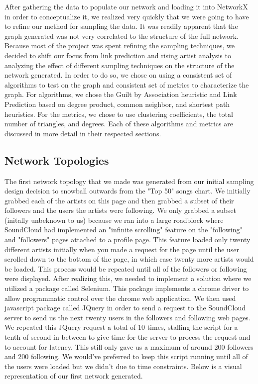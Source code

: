 \documentclass{article}
\begin{document}
After gathering the data to populate our network and loading it into NetworkX in order to conceptualize it, we realized very quickly that we were going to have to refine our method for sampling the data.  It was readily apparent that the graph generated was not very correlated to the structure of the full network.  Because most of the project was spent refining the sampling techniques, we decided to shift our focus from link prediction and rising artist analysis to analyzing the effect of different sampling techniques on the structure of the network generated.  In order to do so, we chose on using a consistent set of algorithms to test on the graph and consistent set of metrics to characterize the graph.  For algorithms, we chose the Guilt by Association heuristic and Link Prediction based on degree product, common neighbor, and shortest path heuristics.  For the metrics, we chose to use clustering coefficients, the total number of triangles, and degrees.  Each of these algorithms and metrics are discussed in more detail in their respected sections.

\subsection{Network Topologies}
The first network topology that we made was generated from our initial sampling design decision to snowball outwards from the "Top 50" songs chart.  We initially grabbed each of the artists on this page and then grabbed a subset of their followers and the users the artists were following.  We only grabbed a subset (initally unbeknown to us) because we ran into a large roadblock where SoundCloud had implemented an "infinite scrolling" feature on the "following" and "followers" pages attached to a profile page.  This feature loaded only twenty different artists initially when you made a request for the page until the user scrolled down to the bottom of the page, in which case twenty more artists would be loaded.  This process would be repeated until all of the followers or following were displayed.  After realizing this, we needed to implement a solution where we utilized a package called Selenium. This package implements a chrome driver to allow programmatic control over the chrome web application.  We then used javascript package called JQuery in order to send a request to the SoundCloud server to send us the next twenty users in the followers and following web pages.  We repeated this JQuery request a total of 10 times, stalling the script for a tenth of second in between to give time for the server to process the request and to account for latency.  This still only gave us a maximum of around 200 followers and 200 following.  We would've preferred to keep this script running until all of the users were loaded but we didn't due to time constraints.  Below is a visual representation of our first network generated. 
\end{document}
